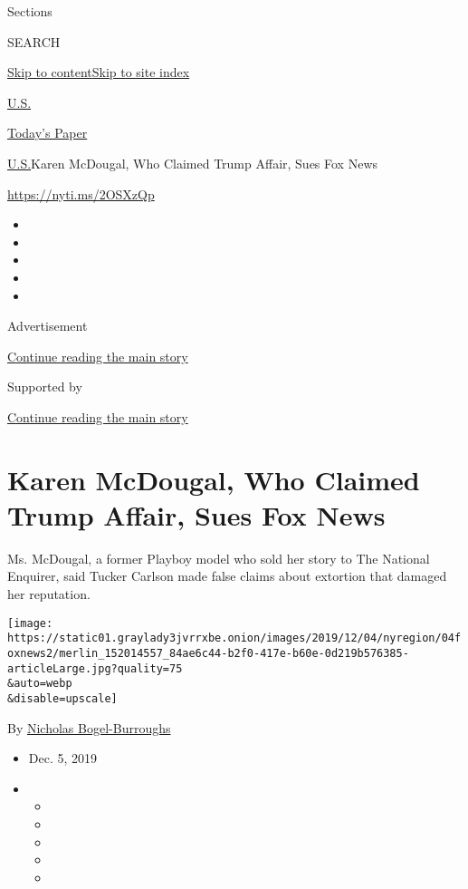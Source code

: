 Sections

SEARCH

\protect\hyperlink{site-content}{Skip to
content}\protect\hyperlink{site-index}{Skip to site index}

\href{https://www.nytimes3xbfgragh.onion/section/us}{U.S.}

\href{https://myaccount.nytimes3xbfgragh.onion/auth/login?response_type=cookie\&client_id=vi}{}

\href{https://www.nytimes3xbfgragh.onion/section/todayspaper}{Today's
Paper}

\href{/section/us}{U.S.}\textbar{}Karen McDougal, Who Claimed Trump
Affair, Sues Fox News

\url{https://nyti.ms/2OSXzQp}

\begin{itemize}
\item
\item
\item
\item
\item
\end{itemize}

Advertisement

\protect\hyperlink{after-top}{Continue reading the main story}

Supported by

\protect\hyperlink{after-sponsor}{Continue reading the main story}

\hypertarget{karen-mcdougal-who-claimed-trump-affair-sues-fox-news}{%
\section{Karen McDougal, Who Claimed Trump Affair, Sues Fox
News}\label{karen-mcdougal-who-claimed-trump-affair-sues-fox-news}}

Ms. McDougal, a former Playboy model who sold her story to The National
Enquirer, said Tucker Carlson made false claims about extortion that
damaged her reputation.

\texttt{[image: https://static01.graylady3jvrrxbe.onion/images/2019/12/04/nyregion/04foxnews2/merlin\_152014557\_84ae6c44-b2f0-417e-b60e-0d219b576385-articleLarge.jpg?quality=75\\\&auto=webp\\\&disable=upscale]}

By
\href{https://www.nytimes3xbfgragh.onion/by/nicholas-bogel-burroughs}{Nicholas
Bogel-Burroughs}

\begin{itemize}
\item
  Dec. 5, 2019
\item
  \begin{itemize}
  \item
  \item
  \item
  \item
  \item
  \end{itemize}
\end{itemize}

